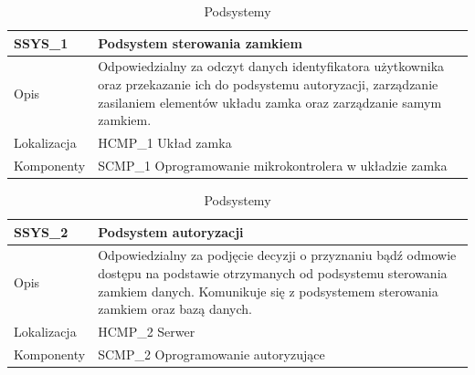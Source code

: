                 \begin{table}
                    \caption{Podsystemy}
                    \centering
                    \begin{subtable}[c]{\textwidth}
                        \centering
                        \begin{tabular}{|p{2cm}|p{12cm}|}
                            \hline SSYS\_1      & \textbf{Podsystem sterowania zamkiem} \\
                            \hline \cellcolor[gray]{0.8} Opis         & Odpowiedzialny za odczyt danych identyfikatora użytkownika oraz przekazanie ich do podsystemu autoryzacji, zarządzanie zasilaniem elementów układu zamka oraz zarządzanie samym zamkiem.  \\
                            \hline \cellcolor[gray]{0.8} Lokalizacja  & HCMP\_1 Układ zamka    \\
                            \hline \cellcolor[gray]{0.8} Komponenty   & SCMP\_1 Oprogramowanie mikrokontrolera w układzie zamka    \\
                            \hline
                        \end{tabular}
                        \label{tbl:scmp1}
                        \vspace{10mm}           
                    \end{subtable}
                \quad%
                    \begin{subtable}[c]{\textwidth}
                        \centering
                        \begin{tabular}{|p{2cm}|p{12cm}|}
                            \hline SSYS\_2      & \textbf{Podsystem autoryzacji} \\
                            \hline \cellcolor[gray]{0.8} Opis         & Odpowiedzialny za podjęcie decyzji o przyznaniu bądź odmowie dostępu na podstawie otrzymanych od podsystemu sterowania zamkiem danych. Komunikuje się z podsystemem sterowania zamkiem oraz bazą danych. \\
                            \hline \cellcolor[gray]{0.8} Lokalizacja  & HCMP\_2 Serwer    \\
                            \hline \cellcolor[gray]{0.8} Komponenty   & SCMP\_2 Oprogramowanie autoryzujące \\
                            \hline
                        \end{tabular}
                        \label{tbl:ssys2}
                        \vspace{10mm}           

\end{subtable}
\end{table}
